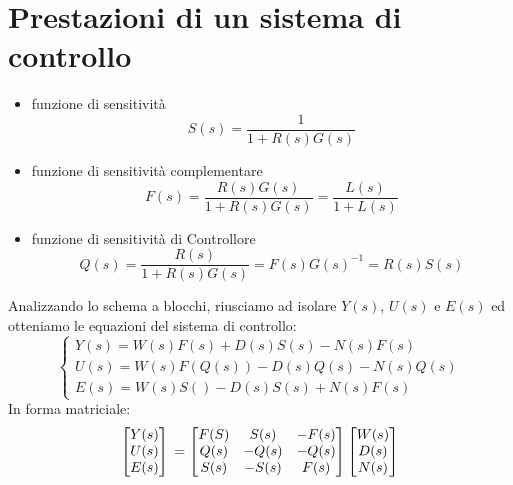 \documentclass[a4paper]{report}
\begin{document}
\section{Prestazioni di un sistema di controllo}

\begin{itemize}
\item funzione di sensitivit\`a
  \begin{equation}\label{eq:funzioneDiSensitivita}
  S(s) = \dfrac{1}{1 + R(s)G(s)}
  \end{equation}
\item funzione di sensitivit\`a complementare
  \begin{equation}\label{eq:funzioneDiSensitivitaComplementare}
  F(s) = \dfrac{R(s) G(s)}{1 + R(s) G(s)} = \dfrac{L(s)}{1 + L(s)}
  \end{equation}
\item funzione di sensitivit\`a di Controllore
  \begin{equation}\label{eq:funzioneDiSensitivitaDiControllore}
  Q(s) = \dfrac{R(s)}{1 + R(s) G(s)} = F(s)G(s)^{-1} = R(s)S(s)
  \end{equation}
\end{itemize}
Analizzando lo schema a blocchi, riusciamo ad isolare $Y(s)$, $U(s)$ e
$E(s)$ ed otteniamo le equazioni del sistema di controllo:
\begin{equation}\label{eq:sistemaDiControllo}
\left \{
\begin{array}{l}
  Y(s) = W(s)F(s) + D(s)S(s) - N(s)F(s)\\
  U(s) = W(s)F(Q(s)) - D(s)Q(s) - N(s)Q(s)\\
  E(s) = W(s)S() - D(s)S(s) + N(s)F(s)
\end{array}
\right .
\end{equation}
In forma matriciale:
\[
  \begin{bmatrix}
    Y(s)\\
    U(s)\\
    E(s)
  \end{bmatrix}\\
  =
  \begin{bmatrix}
    F(S) & S(s) & -F(s)\\
    Q(s) & -Q(s) & -Q(s)\\
    S(s) & -S(s) & F(s)
  \end{bmatrix}
  \begin{bmatrix}
    W(s)\\
    D(s)\\
    N(s)
  \end{bmatrix}
\]
\end{document}
